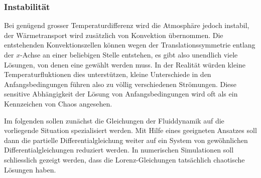 \subsubsection{Instabilität}
Bei genügend grosser Temperaturdifferenz wird die Atmosphäre jedoch
instabil, der Wärmetransport wird zusätzlich von Konvektion übernommen.
Die entstehenden Konvektionszellen können wegen der Translationssymmetrie
entlang der $x$-Achse an einer beliebigen Stelle entstehen, es gibt also
unendlich viele Lösungen, von denen eine gewählt werden muss.
In der Realität würden kleine Temperaturfluktionen dies unterstützen,
kleine Unterschiede in den Anfangsbedingungen führen also zu völlig
verschiedenen Strömungen.
Diese sensitive Abhängigkeit der Lösung von Anfangsbedingungen wird
oft als ein Kennzeichen von Chaos angesehen.

Im folgenden sollen zunächst die Gleichungen der Fluiddynamik auf die
vorliegende Situation spezialisiert werden.
Mit Hilfe eines geeigneten Ansatzes soll dann die partielle
Differentialgleichung weiter auf ein System von gewöhnlichen 
Differentialgleichungen reduziert werden.
In numerischen Simulationen soll schliesslich gezeigt werden, dass die 
Lorenz-Gleichungen tatsächlich chaotische Lösungen haben.

